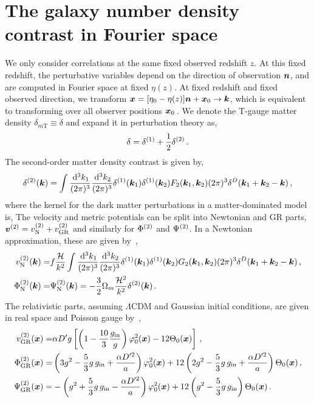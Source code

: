 \section{The galaxy number density contrast in Fourier space}
We only consider correlations at the same fixed observed redshift $z$. At this fixed redshift, the perturbative variables depend on the direction of observation $\bm {n}$, and are computed in Fourier space at fixed $\eta(z)$. At fixed redshift and fixed observed direction, we transform $\bm {x} = [\eta_0 - \eta(z)]\bm {n} + \bm {x}_0 \to \bm {k}$, which is equivalent to transforming over all observer positions $\bm {x}_0$\,. We denote the T-gauge matter density $\delta_{m\mathrm{T}} \equiv \delta$ and expand it in perturbation theory as, 
\begin{equation}
	\delta = \delta^{(1)} + \frac{1}{2} \delta^{(2)}\,.
\end{equation}
The second-order matter density contrast is given by,
\begin{equation}
	\delta^{(2)}(\bm {k}) = \int \frac{\,\mathrm{d}^3 k_1}{(2\pi)^3} \frac{\,\mathrm{d}^3 k_2}{(2\pi)^3} \delta^{(1)}(\bm {k}_1) \delta^{(1)}(\bm {k}_2) F_2(\bm {k}_1,\bm {k}_2)(2\pi)^3 \delta^D(\bm {k}_1+\bm {k}_2-\bm {k})\,,
\end{equation}
where the kernel for the dark matter perturbations in a matter-dominated model is, 
The velocity and metric potentials can be split into Newtonian and GR parts, $\bm{v}^{(2)} = v_{\mathrm{N}}^{(2)} + v_{\mathrm{GR}}^{(2)}$ and similarly for $\Phi^{(2)}$ and $\Psi^{(2)}$. In a Newtonian approximation, these are given by~\cite{Bernardeau:2001qr}, 
\begin{align}
	v^{(2)}_{\mathrm{N}}(\bm {k}) =& f \frac{\mathcal{H}}{k^2} \int \frac{\,\mathrm{d}^3 k_1}{(2\pi)^3} \frac{\,\mathrm{d}^3 k_2}{(2\pi)^3} \delta^{(1)}(\bm {k}_1) \delta^{(1)}(\bm {k}_2) G_2(\bm {k}_1,\bm {k}_2) (2\pi)^3 \delta^D(\bm {k}_1+\bm {k}_2-\bm {k})\,,\\
	\Phi^{(2)}_{\mathrm{N}}(\bm {k}) =& \Psi^{(2)}_{\mathrm{N}}(\bm {k}) = - \frac{3}{2} \Omega_m \frac{\mathcal{H}^2}{k^2} \delta^{(2)}(\bm {k})\,.\label{eq:PsiSOnewtFT}
\end{align}
The relativistic parts, assuming $\Lambda$CDM and Gaussian initial conditions, are given in real space and Poisson gauge by~\cite{Villa:2015ppa},
\begin{align}
	v^{(2)}_{\mathrm{GR}}(\bm {x}) =& \alpha D' g \left[ \left( 1 - \frac{10}{3} \frac{g_\mathrm{in}}{g} \right) \varphi_0^2(\bm {x}) - 12 \Theta_0(\bm {x}) \right]\,, \\
	\Phi^{(2)}_{\mathrm{GR}}(\bm {x}) =& \left(3 g^2 - \frac{5}{3} g\,g_\mathrm{in} + \frac{\alpha D'^2}{a} \right) \varphi_0^2(\bm {x}) + 12 \left( 2 g^2 - \frac{5}{3} g\,g_\mathrm{in} + \frac{\alpha D'^2}{a} \right) \Theta_0(\bm {x})\,,\\
	\Psi^{(2)}_{\mathrm{GR}}(\bm {x}) =& - \left( g^2 + \frac{5}{3} g\,g_\mathrm{in} - \frac{\alpha D'^2}{a} \right) \varphi_0^2(\bm {x}) + 12 \left( g^2 - \frac{5}{3} g\,g_\mathrm{in} \right) \Theta_0(\bm {x})\,.
\end{align}
